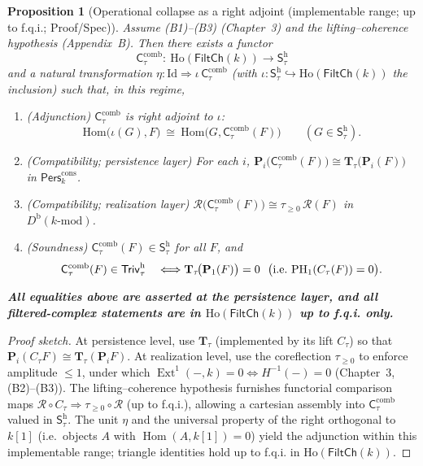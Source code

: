 \documentclass[11pt]{article}
\DeclareMathOperator{\Ext}{Ext}
\DeclareMathOperator{\Hom}{Hom}
\newcommand{\Pers}{\mathsf{Pers}}
\numberwithin{equation}{section}
\newtheorem{proposition}[theorem]{Proposition}
\theoremstyle{definition}
\providecommand{\n}{\unskip\space}
\begin{document}
\begin{proposition}[Operational collapse as a right adjoint (implementable range; up to f.q.i.; Proof/Spec)]\label{prop:operational-coreflection}
Assume \textup{(B1)–(B3)} (Chapter~3) and the lifting–coherence hypothesis (Appendix~B).
Then there exists a functor
\[
\mathsf{C}_\tau^{\mathrm{comb}}:\ \mathrm{Ho}(\mathsf{FiltCh}(k))\longrightarrow \mathsf{S}_\tau^{\mathrm{h}}
\]
and a natural transformation $\eta:\mathrm{Id}\Rightarrow \iota\,\mathsf{C}_\tau^{\mathrm{comb}}$ (with $\iota:\mathsf{S}_\tau^{\mathrm{h}}\hookrightarrow \mathrm{Ho}(\mathsf{FiltCh}(k))$ the inclusion) such that, \emph{in this regime},
\begin{enumerate}
  \item \textup{(Adjunction)} $\mathsf{C}_\tau^{\mathrm{comb}}$ is right adjoint to $\iota$:
  \[
  \mathrm{Hom}\!\big(\iota(G),F\big)\ \cong\ \mathrm{Hom}\!\big(G,\mathsf{C}_\tau^{\mathrm{comb}}(F)\big)\qquad(G\in\mathsf{S}_\tau^{\mathrm{h}}).
  \]
  \item \textup{(Compatibility; persistence layer)} For each $i$, $\mathbf{P}_i\!\big(\mathsf{C}_\tau^{\mathrm{comb}}(F)\big)\cong \mathbf{T}_\tau\!\big(\mathbf{P}_i(F)\big)$ in $\Pers^{\mathrm{cons}}_k$.
  \item \textup{(Compatibility; realization layer)} $\mathcal{R}\!\big(\mathsf{C}_\tau^{\mathrm{comb}}(F)\big)\cong \tau_{\ge 0}\,\mathcal{R}(F)$ in $D^{\mathrm{b}}(k\text{-mod})$.
  \item \textup{(Soundness)} $\mathsf{C}_\tau^{\mathrm{comb}}(F)\in \mathsf{S}_\tau^{\mathrm{h}}$ for all $F$, and
  \[
  \mathsf{C}_\tau^{\mathrm{comb}}(F)\in \mathsf{Triv}_\tau^{\mathrm{h}}\n  \quad\Longleftrightarrow\quad\n  \mathbf{T}_\tau\!\big(\mathbf{P}_1(F)\big)=0\n  \ \ \big(\text{i.e.\ } \mathrm{PH}_1(C_\tau(F))=0\big).
  \]
\end{enumerate}
\emph{\textbf{All equalities above are asserted at the persistence layer, and all filtered-complex statements are in $\mathrm{Ho}(\mathsf{FiltCh}(k))$ up to f.q.i. only.}}
\end{proposition}

\begin{proof}[Proof sketch]
At persistence level, use $\mathbf{T}_\tau$ (implemented by its lift $C_\tau$) so that
$\mathbf{P}_i(C_\tau F)\cong \mathbf{T}_\tau(\mathbf{P}_i F)$.
At realization level, use the coreflection $\tau_{\ge 0}$ to enforce amplitude $\le 1$,
under which $\Ext^1(-,k)=0\iff H^{-1}(-)=0$ (Chapter~3, (B2)–(B3)).
The lifting–coherence hypothesis furnishes functorial comparison maps
$\mathcal{R}\circ C_\tau \Rightarrow \tau_{\ge 0}\circ \mathcal{R}$ (up to f.q.i.),
allowing a cartesian assembly into $\mathsf{C}_\tau^{\mathrm{comb}}$ valued in $\mathsf{S}_\tau^{\mathrm{h}}$.
The unit $\eta$ and the universal property of the right orthogonal to $k[1]$
(i.e.\ objects $A$ with $\Hom(A,k[1])=0$) yield the adjunction within this implementable range;
triangle identities hold up to f.q.i. in $\mathrm{Ho}(\mathsf{FiltCh}(k))$.
\end{proof}
\end{document}
